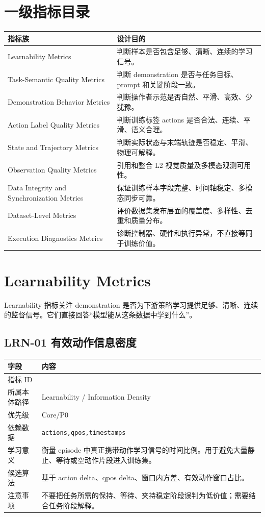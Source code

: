 \documentclass[UTF8,zihao=-4]{ctexart}
\newcommand{\Code}[1]{\texttt{#1}}
\newcommand{\MID}[1]{\texttt{\seqsplit{#1}}}
\begin{document}
\section{一级指标目录}

\begin{longtable}{L{5.0cm} L{8.2cm}}
\toprule
指标族 & 设计目的 \\
\midrule
Learnability Metrics & 判断样本是否包含足够、清晰、连续的学习信号。 \\
Task-Semantic Quality Metrics & 判断 demonstration 是否与任务目标、prompt 和关键阶段一致。 \\
Demonstration Behavior Metrics & 判断操作者示范是否自然、平滑、高效、少犹豫。 \\
Action Label Quality Metrics & 判断训练标签 actions 是否合法、连续、平滑、语义合理。 \\
State and Trajectory Metrics & 判断实际状态与末端轨迹是否稳定、平滑、物理可解释。 \\
Observation Quality Metrics & 引用和整合 L2 视觉质量及多模态观测可用性。 \\
Data Integrity and Synchronization Metrics & 保证训练样本字段完整、时间轴稳定、多模态同步可靠。 \\
Dataset-Level Metrics & 评价数据集发布层面的覆盖度、多样性、去重和质量分布。 \\
Execution Diagnostics Metrics & 诊断控制器、硬件和执行异常，不直接等同于训练价值。 \\
\bottomrule
\end{longtable}

\section{Learnability Metrics}

Learnability 指标关注 demonstration 是否为下游策略学习提供足够、清晰、连续的监督信号。它们直接回答“模型能从这条数据中学到什么”。


\subsection{LRN-01 有效动作信息密度}

\begin{longtable}{L{3.6cm} L{9.6cm}}
\toprule
字段 & 内容 \\
\midrule
指标 ID & \MID{LRN-01} \\
所属本体路径 & Learnability / Information Density \\
优先级 & Core/P0 \\
依赖数据 & \Code{actions,qpos,timestamps} \\
学习意义 & 衡量 episode 中真正携带动作学习信号的时间比例。用于避免大量静止、等待或空动作片段进入训练集。 \\
候选算法 & 基于 action delta、qpos delta、窗口内方差、有效动作窗口占比。 \\
注意事项 & 不要把任务所需的保持、等待、夹持稳定阶段误判为低价值；需要结合任务阶段解释。 \\
\bottomrule
\end{longtable}
\end{document}
